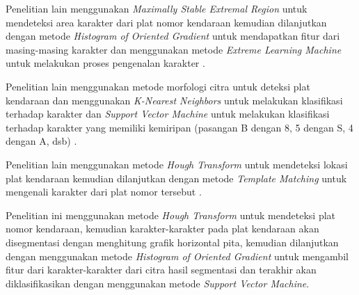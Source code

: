 \noindent Penelitian lain menggunakan \textit{Maximally Stable Extremal Region} untuk mendeteksi area karakter dari plat nomor kendaraan kemudian dilanjutkan dengan metode \textit{Histogram of Oriented Gradient} untuk mendapatkan fitur dari masing-masing karakter dan menggunakan metode \textit{Extreme Learning Machine} untuk melakukan proses pengenalan karakter \cite{gou2014}.

\noindent Penelitian lain menggunakan metode morfologi citra untuk deteksi plat kendaraan dan menggunakan \textit{K-Nearest Neighbors} untuk melakukan klasifikasi terhadap karakter dan \textit{Support Vector Machine} untuk melakukan klasifikasi terhadap karakter yang memiliki kemiripan (pasangan B dengan 8, 5 dengan S, 4 dengan A, dsb) \cite{tabrizi}.

\noindent Penelitian lain menggunakan metode \textit{Hough Transform} untuk mendeteksi lokasi plat kendaraan kemudian dilanjutkan dengan metode \textit{Template Matching} untuk mengenali karakter dari plat nomor tersebut \cite{rasheed}. 

\noindent Penelitian ini menggunakan metode  \textit{Hough Transform} untuk mendeteksi plat nomor kendaraan, kemudian karakter-karakter pada plat kendaraan akan disegmentasi dengan menghitung grafik horizontal pita, kemudian dilanjutkan dengan menggunakan metode \textit{Histogram of Oriented Gradient} untuk mengambil fitur dari karakter-karakter dari citra hasil segmentasi dan terakhir akan diklasifikasikan dengan menggunakan metode \textit{Support Vector Machine}.


